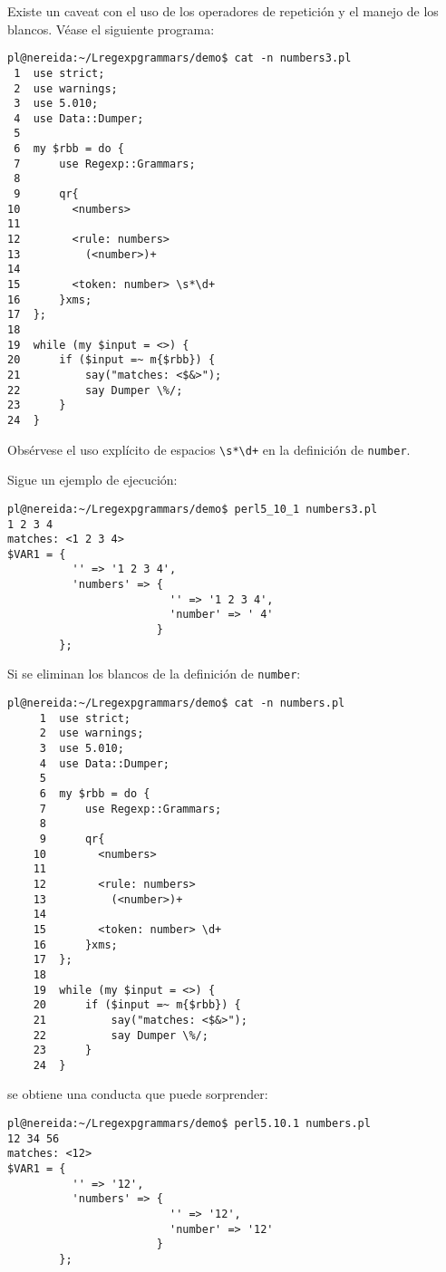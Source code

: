 
Existe un caveat con el uso de los operadores de repetición
y el manejo de los blancos. Véase el siguiente programa:
\begin{verbatim}
pl@nereida:~/Lregexpgrammars/demo$ cat -n numbers3.pl
 1  use strict;
 2  use warnings;
 3  use 5.010;
 4  use Data::Dumper;
 5
 6  my $rbb = do {
 7      use Regexp::Grammars;
 8
 9      qr{
10        <numbers>
11
12        <rule: numbers>
13          (<number>)+
14
15        <token: number> \s*\d+
16      }xms;
17  };
18
19  while (my $input = <>) {
20      if ($input =~ m{$rbb}) {
21          say("matches: <$&>");
22          say Dumper \%/;
23      }
24  }
\end{verbatim}
Obsérvese el uso explícito 
de espacios \verb|\s*\d+| en la definición de \verb|number|.

Sigue un ejemplo de ejecución:
\begin{verbatim}
pl@nereida:~/Lregexpgrammars/demo$ perl5_10_1 numbers3.pl
1 2 3 4
matches: <1 2 3 4>
$VAR1 = {
          '' => '1 2 3 4',
          'numbers' => {
                         '' => '1 2 3 4',
                         'number' => ' 4'
                       }
        };
\end{verbatim}

Si se eliminan los blancos de la definición de 
\verb|number|: 
\begin{verbatim}
pl@nereida:~/Lregexpgrammars/demo$ cat -n numbers.pl
     1  use strict;
     2  use warnings;
     3  use 5.010;
     4  use Data::Dumper;
     5  
     6  my $rbb = do {
     7      use Regexp::Grammars;
     8  
     9      qr{
    10        <numbers>
    11  
    12        <rule: numbers> 
    13          (<number>)+
    14  
    15        <token: number> \d+
    16      }xms;
    17  };
    18  
    19  while (my $input = <>) {
    20      if ($input =~ m{$rbb}) {
    21          say("matches: <$&>");
    22          say Dumper \%/;
    23      }
    24  }
\end{verbatim}
se obtiene una conducta que puede sorprender:
\begin{verbatim}
pl@nereida:~/Lregexpgrammars/demo$ perl5.10.1 numbers.pl 
12 34 56
matches: <12>
$VAR1 = {
          '' => '12',
          'numbers' => {
                         '' => '12',
                         'number' => '12'
                       }
        };
\end{verbatim}

